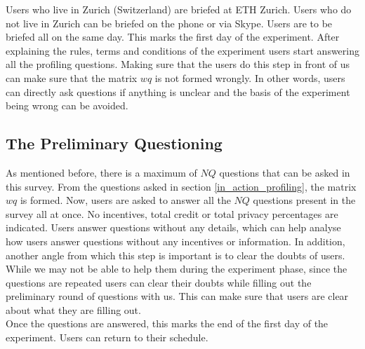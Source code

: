 Users who live in Zurich (Switzerland) are briefed at ETH Zurich. Users who do not live in Zurich
can be briefed on the phone or via Skype. Users are to be briefed all on the same day. This marks the first day of the experiment.
After explaining the rules, terms and conditions of the experiment users start answering all the profiling questions. Making sure that the users do this
step in front of us can make sure that the matrix $wq$ is not formed wrongly. In other words, users can directly ask questions if anything is unclear and the basis of the experiment
being wrong can be avoided.


\subsection{The Preliminary Questioning}
As mentioned before, there is a maximum of $NQ$ questions that can be asked in this survey. From the questions asked in section \ref{in_action_profiling}, the matrix $wq$ is formed.
Now, users are asked to answer all the $NQ$ questions present in the survey all at once. No incentives, total credit or total privacy percentages are indicated. Users answer questions
without any details, which can help analyse how users answer questions without any incentives or information. In addition, another angle from which this
step is important is to clear the doubts of users. While we may not be able to help them during the experiment phase, since the questions
are repeated users can clear their doubts while filling out the preliminary round of questions with us. This can make sure that users are clear about what they are filling out.
\\
Once the questions are answered, this marks the end of the first day of the experiment. Users can return to their schedule.

